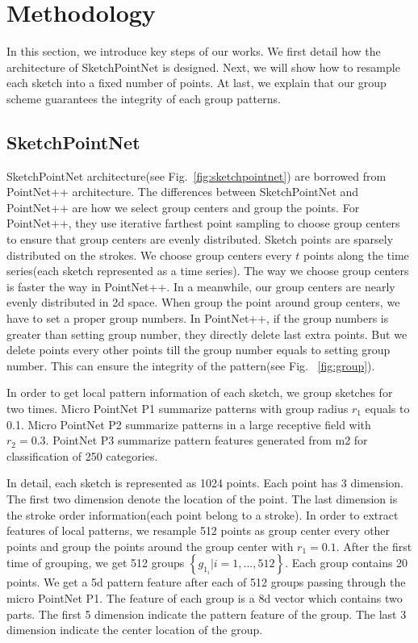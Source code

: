 \section{Methodology}
\label{sec:methodology}

In this section, we introduce key steps of our works. We first detail how the architecture of SketchPointNet is designed. Next, we will show how to resample each sketch into a fixed number of points. At last, we explain that our group scheme guarantees the integrity of each group patterns.

\subsection{SketchPointNet}
\label{ssec:sketch_point_net}

SketchPointNet architecture(see Fig.~\ref{fig:sketchpointnet}) are borrowed from PointNet++ architecture. The differences between SketchPointNet and PointNet++ are how we select group centers and group the points. For PointNet++, they use iterative farthest point sampling to choose group centers to ensure that group centers are evenly distributed. Sketch points are sparsely distributed on the strokes. We choose group centers every $t$ points along the time series(each sketch represented as a time series). The way we choose group centers is faster the way in PointNet++. In a meanwhile,
our group centers are nearly evenly distributed in 2d space. When group the point around group centers, we have to set a proper group numbers. In PointNet++, if the group numbers is greater than setting group number, they directly delete last extra points. But we delete points every other points till the group number equals to setting group number. This can ensure the integrity of the pattern(see Fig. ~\ref{fig:group}).

In order to get local pattern information of each sketch, we group sketches for two times. Micro PointNet P1 summarize patterns with group radius $r_1$ equals to 0.1. Micro PointNet P2 summarize patterns in a large receptive field with $r_2 = 0.3$. PointNet P3 summarize pattern features generated from m2 for classification of 250 categories.

In detail, each sketch is represented as 1024 points. Each point has 3 dimension. The first two dimension denote the location of the point. The last dimension is the stroke order information(each point belong to a stroke). In order to extract features of local patterns, we resample 512 points as group center every other points and group the points around the group center with $r_1 = 0.1$. After the first time of grouping, we get 512 groups $\left\{ g_{1_i}| i = 1, ..., 512 \right\}$. Each group contains 20 points. We get a 5d pattern feature after each of 512 groups passing through the micro PointNet P1. The feature of each group is a 8d vector which contains two parts. The first 5 dimension indicate the pattern feature of the group. The last 3 dimension indicate the center location of the group.


